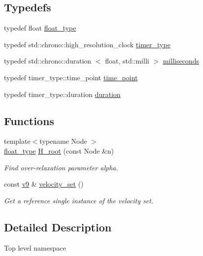 \subsection*{\-Typedefs}
\begin{DoxyCompactItemize}
\item 
typedef float \hyperlink{namespacelb_a2b37d1585aef2d3da421ad0aedc6b11b}{float\-\_\-type}
\item 
typedef \*
std\-::chrono\-::high\-\_\-resolution\-\_\-clock \hyperlink{namespacelb_a1acb659edeec66aceb5403fd0b90942c}{timer\-\_\-type}
\item 
typedef std\-::chrono\-::duration\*
$<$ float, std\-::milli $>$ \hyperlink{namespacelb_a91eab8920da42c1c74728a490c58ec76}{milliseconds}
\item 
typedef timer\-\_\-type\-::time\-\_\-point \hyperlink{namespacelb_a664b98bd4013970d2005405e23ef78d9}{time\-\_\-point}
\item 
typedef timer\-\_\-type\-::duration \hyperlink{namespacelb_ac6197d62b7eeafa021fdcf0a45fa3bfe}{duration}
\end{DoxyCompactItemize}
\subsection*{\-Functions}
\begin{DoxyCompactItemize}
\item 
{\footnotesize template$<$typename Node $>$ }\\\hyperlink{namespacelb_a2b37d1585aef2d3da421ad0aedc6b11b}{float\-\_\-type} \hyperlink{namespacelb_a949695fd91aad40af46e42af8c7e0a6c}{\-H\-\_\-root} (const \-Node \&n)
\begin{DoxyCompactList}\small\item\em \-Find over-\/relaxation parameter alpha. \end{DoxyCompactList}\item 
const \hyperlink{structlb_1_1v9}{v9} \& \hyperlink{namespacelb_a28c9e82e6454a4c6c8a33b06695a7881}{velocity\-\_\-set} ()
\begin{DoxyCompactList}\small\item\em \-Get a reference single instance of the velocity set. \end{DoxyCompactList}\end{DoxyCompactItemize}


\subsection{\-Detailed \-Description}
\-Top level namespace 

